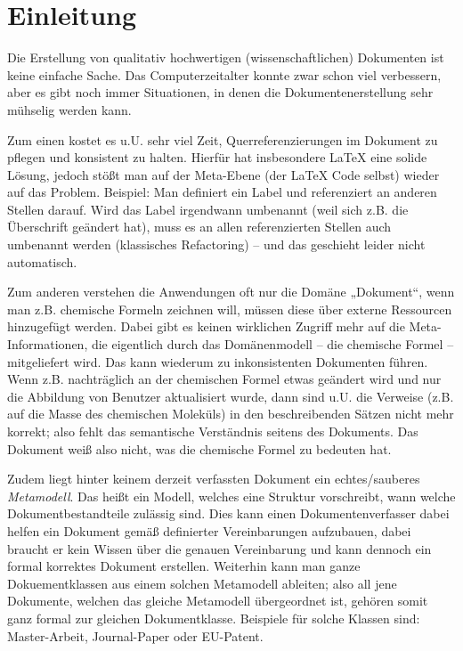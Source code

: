 \chapter{Einleitung}

Die Erstellung von qualitativ hochwertigen (wissenschaftlichen) Dokumenten ist keine einfache Sache.
Das Computerzeitalter konnte zwar schon viel verbessern, aber es gibt noch
immer Situationen, in denen die Dokumentenerstellung sehr mühselig werden kann.

Zum einen kostet es u.U. sehr viel Zeit, Querreferenzierungen im Dokument zu
pflegen und konsistent zu halten.
Hierfür hat insbesondere LaTeX eine solide Lösung, jedoch stößt man auf der Meta-Ebene
(der LaTeX Code selbst) wieder auf das Problem. Beispiel: Man definiert ein
Label und referenziert an anderen Stellen darauf. Wird das Label irgendwann umbenannt
(weil sich z.B. die Überschrift geändert hat), muss es an allen referenzierten
Stellen auch umbenannt werden (klassisches Refactoring) -- und das geschieht
leider nicht automatisch.

Zum anderen verstehen die Anwendungen oft nur die Domäne „Dokument“,
wenn man z.B. chemische Formeln zeichnen will, müssen diese über externe
Ressourcen hinzugefügt werden. Dabei gibt es keinen wirklichen Zugriff
mehr auf die Meta-Informationen, die eigentlich durch das Domänenmodell
-- die chemische Formel -- mitgeliefert wird. Das kann wiederum zu inkonsistenten
Dokumenten führen. Wenn z.B. nachträglich an der chemischen Formel etwas
geändert wird und nur die Abbildung von Benutzer aktualisiert wurde,
dann sind u.U. die Verweise
(z.B. auf die Masse des chemischen Moleküls)
in den beschreibenden Sätzen nicht mehr korrekt;
also fehlt das semantische Verständnis seitens des Dokuments.
Das Dokument weiß also nicht, was die chemische Formel zu bedeuten hat.

Zudem liegt hinter keinem derzeit verfassten Dokument ein echtes/sauberes \emph{Metamodell}.
Das heißt ein Modell, welches eine Struktur vorschreibt, wann welche Dokumentbestandteile
zulässig sind.
Dies kann einen Dokumentenverfasser dabei helfen ein Dokument gemäß definierter
Vereinbarungen aufzubauen, dabei braucht er kein Wissen über die genauen Vereinbarung und kann
dennoch ein formal korrektes Dokument erstellen.
Weiterhin kann man ganze Dokuementklassen aus einem solchen Metamodell ableiten;
also all jene Dokumente, welchen das gleiche
Metamodell übergeordnet ist, gehören somit ganz formal zur gleichen Dokumentklasse.
Beispiele für solche Klassen sind: Master-Arbeit, Journal-Paper oder EU-Patent.

